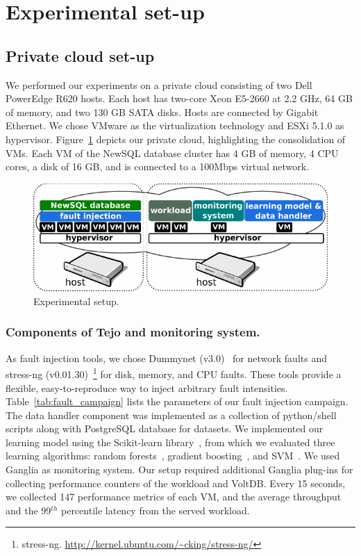 \section{Experimental set-up}
\label{sec:experiment}



\subsection{Private cloud set-up}

We performed our experiments on a private cloud consisting of two Dell PowerEdge R620 hosts. Each host has two-core Xeon E5-2660 at 2.2 GHz, 64 GB of memory, and two 130 GB SATA disks. Hosts are connected by Gigabit Ethernet. We chose VMware as the virtualization technology and ESXi 5.1.0 as hypervisor. Figure~\ref{fig:experimental_scenario_extended} depicts our private cloud, highlighting the consolidation of VMs. Each VM of the NewSQL database cluster has 4 GB of memory, 4 CPU cores, a disk of 16 GB, and is connected to a 100Mbps virtual network.

\begin{figure}[!h]
  \centering
     \includegraphics[width=1\textwidth]{inputs/img/experimental_scenario_extended_2}
  \caption{Experimental setup.}
  \label{fig:experimental_scenario_extended}
\end{figure}

\subsubsection{Components of Tejo and monitoring system.} As fault injection tools, we chose Dummynet (v3.0)~\cite{carbone2010dummynet} for network faults and stress-ng (v0.01.30)~\footnote{stress-ng. \url{http://kernel.ubuntu.com/~cking/stress-ng/}} for disk, memory, and CPU faults. These tools provide a flexible, easy-to-reproduce way to inject arbitrary fault intensities. Table~\ref{tab:fault_campaign} lists the parameters of our fault injection campaign. The data handler component was implemented as a collection of python/shell scripts along with PostgreSQL database for datasets. We implemented our learning model using the Scikit-learn library~\cite{scikitlearn11}, from which we evaluated three learning algorithms: random forests~\cite{breiman2001random}, gradient boosting~\cite{friedman2006recent}, and SVM~\cite{svm_1995}. We used Ganglia as monitoring system. Our setup required additional Ganglia plug-ins for collecting performance counters of the workload and VoltDB. Every 15 seconds, we collected 147 performance metrics of each VM, and the average throughput and the 99$^{th}$ percentile latency from the served workload. 

